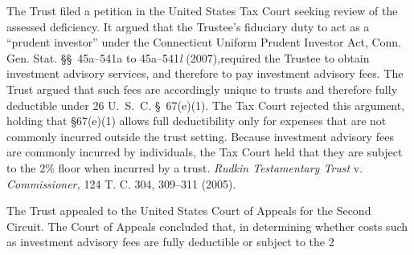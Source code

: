   The Trust filed a petition in the United States Tax Court seeking review of the assessed deficiency. It argued that the Trustee's fiduciary duty to act as a ``prudent investor'' \newpage  under the Connecticut Uniform Prudent Investor Act, Conn. Gen. Stat. \S\S~45a--541a to 45a--541\emph{l} (2007),\footnotemark[2] required the Trustee to obtain investment advisory services, and therefore to pay investment advisory fees. The Trust argued that such fees are accordingly unique to trusts and therefore fully deductible under 26 U.~S.~C. \S~67(e)(1). The Tax Court rejected this argument, holding that \S67(e)(1) allows full deductibility only for expenses that are not commonly incurred outside the trust setting. Because investment advisory fees are commonly incurred by individuals, the Tax Court held that they are subject to the 2\% floor when incurred by a trust. \emph{Rudkin Testamentary Trust} v. \emph{Commissioner,} 124 T. C. 304, 309--311 (2005).


  The Trust appealed to the United States Court of Appeals for the Second Circuit. The Court of Appeals concluded that, in determining whether costs such as investment advisory fees are fully deductible or subject to the 2%


